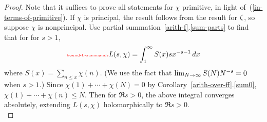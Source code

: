 \begin{proof}
%
Note that it suffices to prove all statements for $\chi$ primitive, in light of~(\ref{in-terms-of-primitive}). If $\chi$ is principal, the result follows from the result for $\zeta$, so suppose $\chi$ is nonprincipal. Use partial summation~\ref{arith-f}.\ref{sum-parts} to find that for for $s>1$,
\begin{equation}\llabel{bound-L-summands}
L(s,\chi)=\int_1^{\iy} S(x) sx^{-s-1}\,dx
\end{equation}
where $S(x)=\sum_{n\le x}\chi(n)$.
(We use the fact that $\lim_{N\to \infty}S(N)N^{-s}=0$ when $s>1$.) 
Since $\chi(1)+\cdots +\chi(N)=0$ by Corollary~\ref{arith-over-ff}.\ref{sum0}, $\chi(1)+\cdots+\chi(n)\le N$. Then for $\Re s>0$, the above integral converges absolutely, extending $L(s,\chi)$ holomorphically to $\Re s>0$.\\
%


\end{proof}
